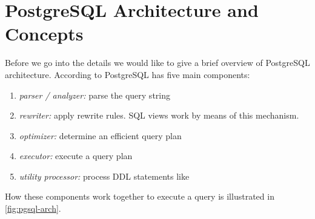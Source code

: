 
\section{PostgreSQL Architecture and Concepts}

Before we go into the details we would like to give a brief overview
of PostgreSQL architecture. According to \citep{Conway2006a} PostgreSQL
has five main components:

\begin{enumerate}
\item \emph{parser / analyzer:\/} parse the query string
\item \emph{rewriter:\/} apply rewrite rules. SQL views work by means of this mechanism.
\item \emph{optimizer:\/} determine an efficient query plan
\item \emph{executor:\/} execute a query plan
\item \emph{utility processor:\/} process DDL statements like 
\end{enumerate}

\noindent
How these components work together to execute a query is illustrated
in \autoref{fig:pgsql-arch}.

